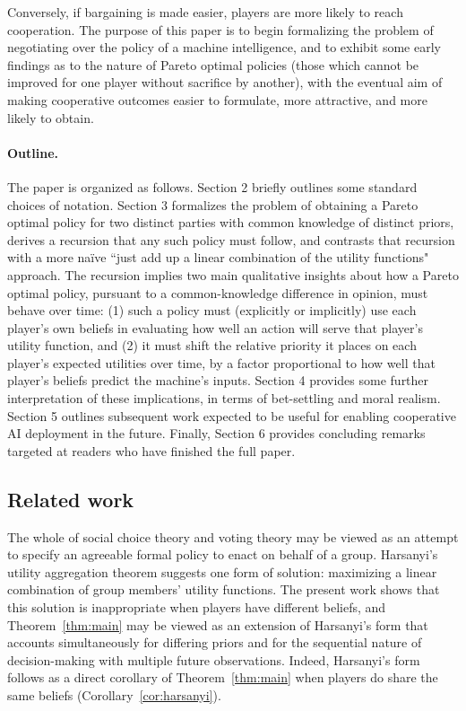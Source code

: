 \documentclass{article}  %
\newcommand{\thm}[1]{Theorem~\ref{thm:#1}}
\newcommand{\cor}[1]{Corollary~\ref{cor:#1}}
\begin{document}
Conversely, if bargaining is made easier, players are more likely to reach cooperation.  The purpose of this paper is to begin formalizing the problem of negotiating over the policy of a machine intelligence, and to exhibit some early findings as to the nature of Pareto optimal policies (those which cannot be improved for one player without sacrifice by another), with the eventual aim of making cooperative outcomes easier to formulate, more attractive, and more likely to obtain.

\paragraph{Outline.} The paper is organized as follows.  Section 2 briefly outlines some standard choices of notation.  Section 3 formalizes the problem of obtaining a Pareto optimal policy for two distinct parties with common knowledge of distinct priors, derives a recursion that any such policy must follow, and contrasts that recursion with a more na\"{i}ve ``just add up a linear combination of the utility functions" approach.  The recursion implies two main qualitative insights about how a Pareto optimal policy, pursuant to a common-knowledge difference in opinion, must behave over time: (1) such a policy must (explicitly or implicitly) use each player's own beliefs in evaluating how well an action will serve that player's utility function, and (2) it must shift the relative priority it places on each player's expected utilities over time, by a factor proportional to how well that player's beliefs predict the machine's inputs.  Section 4 provides some further interpretation of these implications, in terms of bet-settling and moral realism.  Section 5 outlines subsequent work expected to be useful for enabling cooperative AI deployment in the future.  Finally, Section 6 provides concluding remarks targeted at readers who have finished the full paper.

\subsection{Related work}

The whole of social choice theory and voting theory may be viewed as an attempt to specify an agreeable formal policy to enact on behalf of a group.  Harsanyi's utility aggregation theorem \cite{Har55} suggests one form of solution: maximizing a linear combination of group members' utility functions.  The present work shows that this solution is inappropriate when players have different beliefs, and \thm{main} may be viewed as an extension of Harsanyi's form that accounts simultaneously for differing priors and for the sequential nature of decision-making with multiple future observations.  Indeed, Harsanyi's form follows as a direct corollary of \thm{main} when players do share the same beliefs (\cor{harsanyi}).
\end{document}
